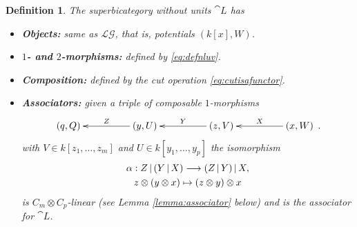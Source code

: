 \documentclass[english,letter paper,12pt,leqno]{article}
\theoremstyle{example}
\newtheorem{definition}[theorem]{Definition}
\numberwithin{equation}{section}
\def\LG{\mathcal{LG}}
\begin{document}
\begin{definition} The superbicategory without units $\cat{L}$ has
\begin{itemize}
\item \textbf{Objects:} same as $\LG$, that is, potentials $(k[x], W)$.
\item \textbf{$1$- and $2$-morphisms:} defined by \eqref{eq:defnluv}.
\item \textbf{Composition:} defined by the cut operation \eqref{eq:cutisafunctor}.
\item \textbf{Associators:} given a triple of composable $1$-morphisms
\begin{equation}\label{eq:composable_triple}
\xymatrix@C+2pc{
(q, Q) & (y, U) \ar[l]_-{Z} & (z,V) \ar[l]_-{Y} & (x,W) \ar[l]_-{X}
}\,.
\end{equation}
with $V \in k[z_1,\ldots,z_m]$ and $U \in k[y_1,\ldots,y_p]$ the isomorphism
\begin{gather*}
\alpha: Z \,|\, (Y \,|\, X) \longrightarrow (Z \,|\, Y) \,|\, X,\\
z \otimes (y \otimes x) \mapsto (z \otimes y) \otimes x
\end{gather*}
is $C_m \otimes C_p$-linear (see Lemma \ref{lemma:associator} below) and is the associator for $\cat{L}$.
\end{itemize}
\end{definition}
\end{document}
